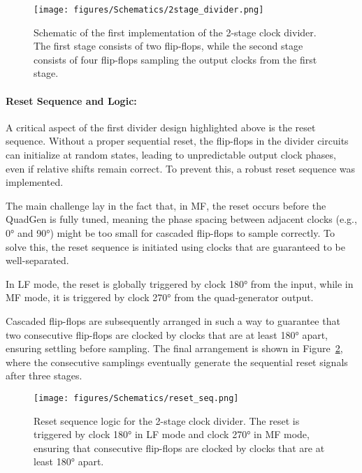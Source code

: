 \begin{figure}[H]
  \centering
  \texttt{[image: figures/Schematics/2stage\_divider.png]}
  \caption{Schematic of the first implementation of the 2-stage clock divider. The first stage consists of two flip-flops, while the second stage consists of four flip-flops sampling the output clocks from the first stage.}
  \label{fig:2stage_divider}
\end{figure}


\paragraph{Reset Sequence and Logic:}

A critical aspect of the first divider design highlighted above is the reset sequence. Without a proper sequential reset, the flip-flops in the divider circuits can initialize at random states, leading to unpredictable output clock phases, even if relative shifts remain correct. To prevent this, a robust reset sequence was implemented.

The main challenge lay in the fact that, in MF, the reset occurs before the QuadGen is fully tuned, meaning the phase spacing between adjacent clocks (e.g., \ang{0} and \ang{90}) might be too small for cascaded flip-flops to sample correctly. To solve this, the reset sequence is initiated using clocks that are guaranteed to be well-separated. 

In LF mode, the reset is globally triggered by clock \ang{180} from the input, while in MF mode, it is triggered by clock \ang{270} from the quad-generator output. 

Cascaded flip-flops are subsequently arranged in such a way to guarantee that two consecutive flip-flops are clocked by clocks that are at least \ang{180} apart, ensuring settling before sampling. The final arrangement is shown in Figure~\ref{fig:reset_seq}, where the consecutive samplings eventually generate the sequential reset signals after three stages.

\begin{figure}[H]
  \centering
  \texttt{[image: figures/Schematics/reset\_seq.png]}
  \caption{Reset sequence logic for the 2-stage clock divider. The reset is triggered by clock \ang{180} in LF mode and clock \ang{270} in MF mode, ensuring that consecutive flip-flops are clocked by clocks that are at least \ang{180} apart.}
  \label{fig:reset_seq}
\end{figure}


